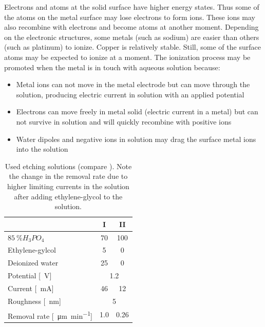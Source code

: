 Electrons and atoms at the solid surface have higher energy states. Thus some of the atoms on the metal surface may lose electrons to form ions. These ions may also recombine with electrons and become atoms at another moment. Depending on the electronic structures, some metals (such as sodium) are easier than others (such as platinum) to ionize. Copper is relatively stable. Still, some of the surface atoms may be expected to ionize at a moment. The ionization process may be promoted when the metal is in touch with aqueous solution because: 
\begin{itemize}
	\item Metal ions can not move in the metal electrode but can move through the solution, producing electric current in solution with an applied potential
	\item Electrons can move freely in metal solid (electric current in a metal) but can not survive in solution and will quickly recombine with positive ions
	\item Water dipoles and negative ions in solution may drag the surface metal ions into the solution
\end{itemize}

\begin{table}\centering
	\caption{Used etching solutions (compare \cite[130]{jinshan_electrochemical_2004}). Note the change in the removal rate due to higher limiting currents in the solution after adding ethylene-glycol to the solution.}
	\begin{tabular}{lcc}
		& I & II \\ \hline \hline
		$\SI{85}{\percent} H_3PO_4$ & 70 & 100 \\
		Ethylene-gylcol & 5 & 0 \\
		Deionized water & 25 & 0 \\ \hline
		Potential [\SI{}{\V}] & \multicolumn{2}{c}{\SI{1.2}{}} \\
		Current [\SI{}{\mA}] & 46 & 12\\
		Roughness [\SI{}{\nm}] & \multicolumn{2}{c}{\SI{5}{}} \\
		Removal rate [\SI{}{\micro\meter\per\minute}] & \SI{1,0}{} & \SI{0,26}{}\\
	\end{tabular}
	\label{table:used-etching-solutions}
\end{table}

